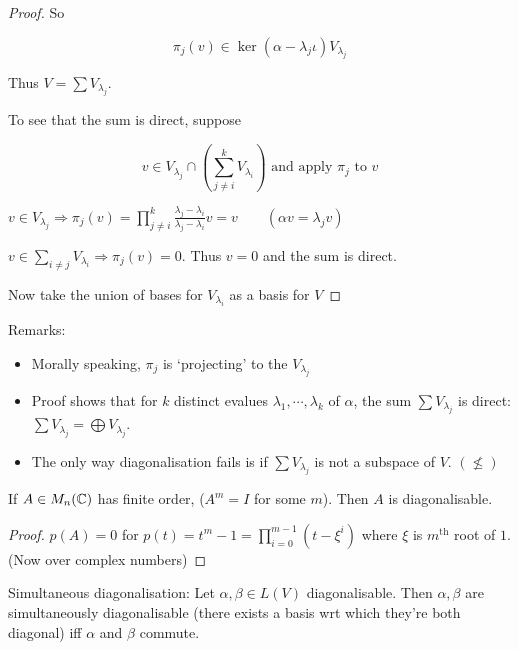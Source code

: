 \documentclass[a4paper]{article}
\begin{document}
\begin{proof}
		So
		
		\[ \pi_{j}(v) \in \ker(\alpha - \lambda_{j} \iota   )V_{\lambda_{j}}   \] 
		
		Thus $ V = \sum V_{\lambda_{j}} $.
		
		To see that the sum is direct, suppose
		
		\[ v \in V_{\lambda_{j}} \cap \left(  \sum_{j \neq i}^{k}V_{\lambda_{i}} \right) \text{ and apply } \pi_{j} \text{ to } v \]
		
		$ v \in V_{\lambda_{j}} \Rightarrow  \pi_{j}(v) = \prod_{j \neq i}^{k}  \frac{\lambda_{j}  - \lambda_{i} }{\lambda_{j} - \lambda_{i}} v = v \qquad \left(  \alpha v = \lambda_{j} v \right)  $
		
		$ v \in \sum_{i \neq j} V_{\lambda_{i}} \Rightarrow \pi_{j}(v) = 0  $. Thus $ v = 0 $ and the sum is direct. 
		
		
		Now take the union of bases for $ V_{\lambda_{i}} $ as a basis for $ V $
		
	\end{proof}
	


Remarks:

\begin{itemize}
	\item Morally speaking, $ \pi_{j} $ is `projecting' to the $ V_{\lambda_{j}} $
	
	\item Proof shows that for $ k $ distinct evalues $ \lambda_{1},\cdots,\lambda_{k} $ of $ \alpha $, the sum $ \sum V_{\lambda_{j}} $ is direct: $ \sum V_{\lambda_{j}} = \bigoplus V_{\lambda_{j}} $.
	
	\item The only way diagonalisation fails is if $ \sum V_{\lambda_{j}} $ is not a subspace of $ V $. $ (\not\leq) $
\end{itemize}


\begin{cor} 
	If $ A \in M_{n}(\mathbb{C}) $ has finite order, ($ A^{m} = I $ for some $ m $). Then $ A $ is diagonalisable. 
\end{cor}

\begin{proof}
	$ p(A) = 0 $ for $ p(t) = t^{m} - 1 =  \prod_{i=0}^{m-1} (t - \xi^{i}) $ where $ \xi $ is $ m^{\text{th}} $ root of $ 1 $. (Now over complex numbers)
\end{proof}

\begin{thm} 
	Simultaneous diagonalisation:
	Let $ \alpha,\beta \in L(V) $ diagonalisable. Then $ \alpha,\beta $ are simultaneously diagonalisable (there exists a basis wrt which they're both diagonal) iff $ \alpha $ and $ \beta $ commute.
\end{thm}
\end{document}
